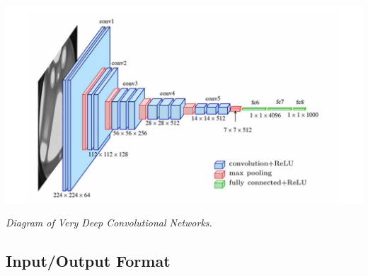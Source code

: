 \vspace{1em}
\begin{center} 
    \includegraphics[width = \textwidth]{../assets/03-model-architecture/cnn-diagram.png}

    \small\textit{Diagram of Very Deep Convolutional Networks. \cite{vcg2021}}
\end{center}
\vspace{1em}


\subsection{Input/Output Format}

